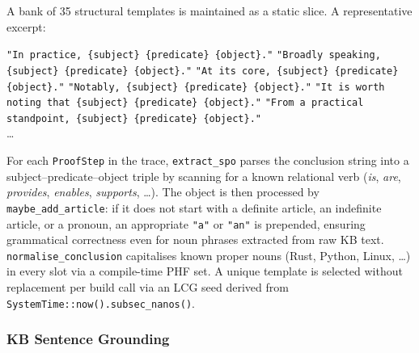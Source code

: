 \documentclass[11pt,a4paper]{article}
\begin{document}
A bank of 35 structural templates is maintained as a static slice. A representative excerpt:
\begin{center}
\texttt{"In practice, \{subject\} \{predicate\} \{object\}."}\quad
\texttt{"Broadly speaking, \{subject\} \{predicate\} \{object\}."}\quad
\texttt{"At its core, \{subject\} \{predicate\} \{object\}."}\quad
\texttt{"Notably, \{subject\} \{predicate\} \{object\}."}\quad
\texttt{"It is worth noting that \{subject\} \{predicate\} \{object\}."}\quad
\texttt{"From a practical standpoint, \{subject\} \{predicate\} \{object\}."}\\
\ldots
\end{center}
For each \texttt{ProofStep} in the trace, \texttt{extract\_spo} parses the conclusion string
into a subject--predicate--object triple by scanning for a known relational verb
(\textit{is}, \textit{are}, \textit{provides}, \textit{enables}, \textit{supports}, \ldots).
The object is then processed by \texttt{maybe\_add\_article}: if it does not start with a
definite article, an indefinite article, or a pronoun, an appropriate \texttt{"a"} or
\texttt{"an"} is prepended, ensuring grammatical correctness even for noun phrases extracted
from raw KB text.
\texttt{normalise\_conclusion} capitalises known proper nouns (Rust, Python, Linux, \ldots)
in every slot via a compile-time PHF set. A unique template is selected without replacement
per build call via an LCG seed derived from \texttt{SystemTime::now().subsec\_nanos()}.

\subsubsection{KB Sentence Grounding}
\end{document}
